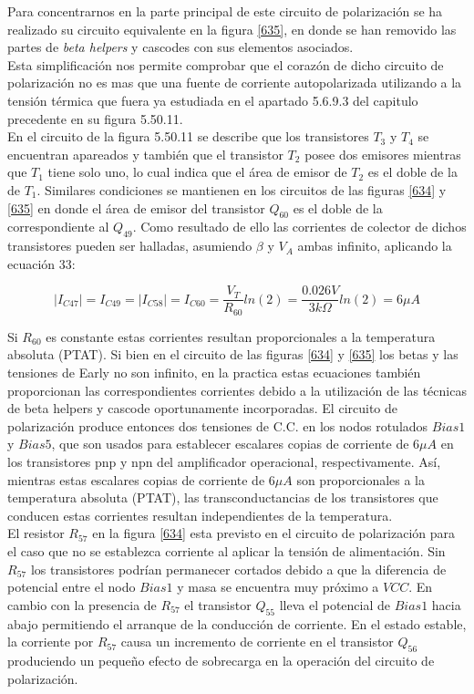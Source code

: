\documentclass[12pt,a4paper,final,headinclude,footinclude,BCOR5mm]{scrartcl}
\begin{document}
Para concentrarnos en la parte principal de este circuito de polarización se ha realizado su circuito equivalente en la figura \ref{635}, en donde se han removido las partes de \textit{beta helpers} y cascodes con sus elementos asociados.\\

Esta simplificación nos permite comprobar que el corazón de dicho circuito de polarización no es mas que una fuente de corriente autopolarizada utilizando a la tensión térmica que fuera ya estudiada en el apartado 5.6.9.3  del capitulo precedente en su figura 5.50.11.\\

En el circuito de la figura 5.50.11 se describe que los transistores $T_{3}$ y $T_{4}$ se encuentran apareados y también que el transistor $T_{2}$ posee dos emisores mientras que $T_{1}$ tiene solo uno, lo cual indica que el área de emisor de $T_{2}$ es el doble de la de $T_{1}$. Similares condiciones se mantienen en los circuitos de las figuras \ref{634} y \ref{635} en donde el área de emisor del transistor $Q_{60}$ es el doble de la correspondiente al $Q_{49}$. Como resultado de ello las corrientes de colector de dichos transistores pueden ser halladas, asumiendo $\beta$ y $V_{A}$ ambas infinito, aplicando la ecuación 33:

\begin{equation}
|I_{C47}| = I_{C49} = |I_{C58}| = I_{C60} = \dfrac{V_{T}}{R_{60}}ln(2) = \dfrac{0.026V}{3k\Omega}ln(2) = 6\mu A
\end{equation}

Si $R_{60}$ es constante estas corrientes resultan proporcionales a la temperatura absoluta (PTAT). Si bien en el circuito de las figuras \ref{634} y \ref{635} los betas y las tensiones de Early no son infinito, en la practica estas ecuaciones también proporcionan las correspondientes corrientes debido a la utilización de las técnicas de beta helpers y cascode oportunamente incorporadas. El circuito de polarización produce entonces dos tensiones de C.C. en los nodos rotulados $Bias1$ y $Bias5$, que son usados para establecer escalares copias de corriente de $6\mu A$ en los transistores pnp y npn del amplificador operacional, respectivamente. Así, mientras estas escalares copias de corriente de $6\mu A$ son proporcionales a la temperatura absoluta (PTAT), las transconductancias de los transistores que conducen estas corrientes resultan independientes de la temperatura.\\

El resistor $R_{57}$ en la figura \ref{634} esta previsto en el circuito de polarización para el caso que no se establezca corriente al aplicar la tensión de alimentación. Sin $R_{57}$ los transistores podrían permanecer cortados debido a que la diferencia de potencial entre el nodo $Bias1$  y masa se encuentra muy próximo a $VCC$. En cambio con la presencia de $R_{57}$ el transistor $Q_{55}$  lleva el potencial de $Bias1$ hacia abajo permitiendo el arranque de la conducción de corriente. En el estado estable, la corriente por $R_{57}$ causa un incremento de corriente en el transistor $Q_{56}$ produciendo un pequeño efecto de sobrecarga en la operación del circuito de polarización.\\
\end{document}
